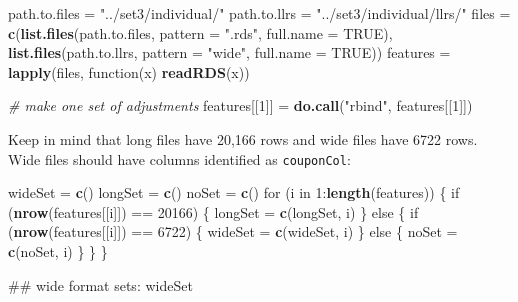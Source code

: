 \documentclass[10pt]{report}
\newenvironment{Shaded}{}{}
\newcommand{\KeywordTok}[1]{\textcolor[rgb]{0.00,0.44,0.13}{\textbf{{#1}}}}
\newcommand{\DataTypeTok}[1]{\textcolor[rgb]{0.56,0.13,0.00}{{#1}}}
\newcommand{\DecValTok}[1]{\textcolor[rgb]{0.25,0.63,0.44}{{#1}}}
\newcommand{\StringTok}[1]{\textcolor[rgb]{0.25,0.44,0.63}{{#1}}}
\newcommand{\CommentTok}[1]{\textcolor[rgb]{0.38,0.63,0.69}{\textit{{#1}}}}
\newcommand{\OtherTok}[1]{\textcolor[rgb]{0.00,0.44,0.13}{{#1}}}
\newcommand{\NormalTok}[1]{{#1}}
\begin{document}
\begin{Shaded}
\begin{Highlighting}[]
\NormalTok{path.to.files =}\StringTok{ "../set3/individual/"}
\NormalTok{path.to.llrs =}\StringTok{ "../set3/individual/llrs/"}
\NormalTok{files =}\StringTok{ }\KeywordTok{c}\NormalTok{(}\KeywordTok{list.files}\NormalTok{(path.to.files, }\DataTypeTok{pattern =} \StringTok{".rds"}\NormalTok{, }\DataTypeTok{full.name =} \OtherTok{TRUE}\NormalTok{), }\KeywordTok{list.files}\NormalTok{(path.to.llrs, }
    \DataTypeTok{pattern =} \StringTok{"wide"}\NormalTok{, }\DataTypeTok{full.name =} \OtherTok{TRUE}\NormalTok{))}
\NormalTok{features =}\StringTok{ }\KeywordTok{lapply}\NormalTok{(files, function(x) }\KeywordTok{readRDS}\NormalTok{(x))}

\CommentTok{# make one set of adjustments}
\NormalTok{features[[}\DecValTok{1}\NormalTok{]] =}\StringTok{ }\KeywordTok{do.call}\NormalTok{(}\StringTok{"rbind"}\NormalTok{, features[[}\DecValTok{1}\NormalTok{]])}
\end{Highlighting}
\end{Shaded}

Keep in mind that long files have 20,166 rows and wide files have 6722
rows. Wide files should have columns identified as \verb!couponCol!:

\begin{Shaded}
\begin{Highlighting}[]
\NormalTok{wideSet =}\StringTok{ }\KeywordTok{c}\NormalTok{()}
\NormalTok{longSet =}\StringTok{ }\KeywordTok{c}\NormalTok{()}
\NormalTok{noSet =}\StringTok{ }\KeywordTok{c}\NormalTok{()}
\NormalTok{for (i in }\DecValTok{1}\NormalTok{:}\KeywordTok{length}\NormalTok{(features)) \{}
    \NormalTok{if (}\KeywordTok{nrow}\NormalTok{(features[[i]]) ==}\StringTok{ }\DecValTok{20166}\NormalTok{) \{}
        \NormalTok{longSet =}\StringTok{ }\KeywordTok{c}\NormalTok{(longSet, i)}
    \NormalTok{\} else \{}
        \NormalTok{if (}\KeywordTok{nrow}\NormalTok{(features[[i]]) ==}\StringTok{ }\DecValTok{6722}\NormalTok{) \{}
            \NormalTok{wideSet =}\StringTok{ }\KeywordTok{c}\NormalTok{(wideSet, i)}
        \NormalTok{\} else \{}
            \NormalTok{noSet =}\StringTok{ }\KeywordTok{c}\NormalTok{(noSet, i)}
        \NormalTok{\}}
    \NormalTok{\}}
\NormalTok{\}}

\NormalTok{## wide format sets:}
\NormalTok{wideSet}
\end{Highlighting}
\end{Shaded}
\end{document}
